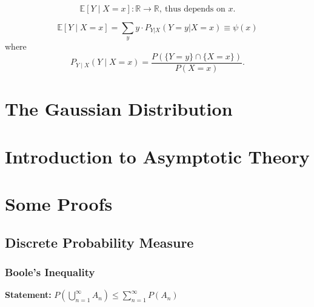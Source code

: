 \[
\mathbb{E}[Y \mid X = x]: \mathbb{R} \to \mathbb{R}, \ \text{thus depends on } x.
\]
\begin{clm}
\[
\mathbb{E}[Y \mid X = x] = \sum_y y \cdot P_{Y|X}(Y=y|X=x)\equiv \psi(x)
\]
where
\[
P_{Y \mid X}(Y \mid X = x) = \frac{P(\{Y = y\} \cap \{X = x\})}{P(X = x)}.
\]
\end{clm}

\newpage
\section{The Gaussian Distribution}


\newpage
\section{Introduction to Asymptotic Theory}

\newpage
\appendix
\section{Some Proofs}
\subsection{Discrete Probability Measure}
\subsubsection{Boole's Inequality}
\label{proof: boole}
\textbf{Statement:}
$P\left(\bigcup_{n=1}^\infty A_n\right)\leq\sum_{n=1}^\infty P(A_n)$

